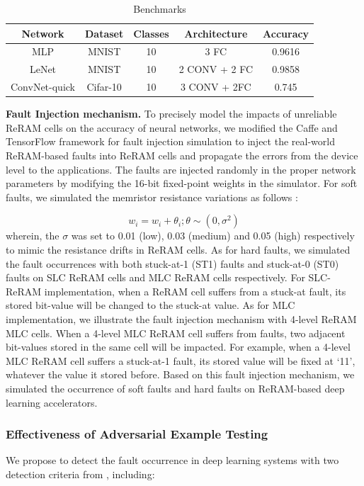 \begin{table}[b]
    \centering
    \caption{Benchmarks}
    \setlength{\tabcolsep}{2mm}
    \label{tab:dataset}
    \begin{tabular}{@{}ccccc}
        \toprule
        Network &  Dataset  & Classes&Architecture&Accuracy\\
        \midrule
        MLP&MNIST&10&3 FC&0.9616\\
        LeNet&MNIST&10&2 CONV + 2 FC&0.9858\\
        ConvNet-quick&Cifar-10 \quad &10&3 CONV + 2FC&0.745\\
        \bottomrule
    \end{tabular}
\end{table}

{\bf Fault Injection mechanism.} 
To precisely model the impacts of unreliable ReRAM cells on the accuracy of neural networks, we modified the Caffe and TensorFlow framework for fault injection simulation to inject the real-world ReRAM-based faults into ReRAM cells and propagate the errors from the device level to the applications. The faults are injected randomly in the proper network parameters by modifying the 16-bit fixed-point weights in the simulator. For soft faults, we simulated the memristor resistance variations as follows \cite{7926952}:

\begin{equation}
    {w_i} = {w_i}+{{\theta _i}};\theta  \sim (0,{\sigma ^2})
\end{equation}
wherein, the $\sigma$ was set to 0.01 (low), 0.03 (medium) and 0.05 (high) respectively to mimic the resistance drifts in ReRAM cells. 
As for hard faults, we simulated the fault occurrences with both stuck-at-1 (ST1) faults and stuck-at-0 (ST0) faults on SLC ReRAM cells and MLC ReRAM cells respectively. For SLC-ReRAM implementation, when a ReRAM cell suffers from a stuck-at fault, its stored bit-value will be changed to the stuck-at value. As for MLC implementation, we illustrate the fault injection mechanism with 4-level ReRAM MLC cells. When a 4-level MLC ReRAM cell suffers from faults, two adjacent bit-values stored in the same cell will be impacted. For example, when a 4-level MLC ReRAM cell suffers a stuck-at-1 fault, its stored value will be fixed at `11', whatever the value it stored before. Based on this fault injection mechanism, we simulated the occurrence of soft faults and hard faults on ReRAM-based deep learning accelerators.

\subsubsection{Effectiveness of Adversarial Example Testing}
We propose to detect the fault occurrence in deep learning systems with two detection criteria from \cite{Li:2017:UEP:3126908.3126964}, including:

